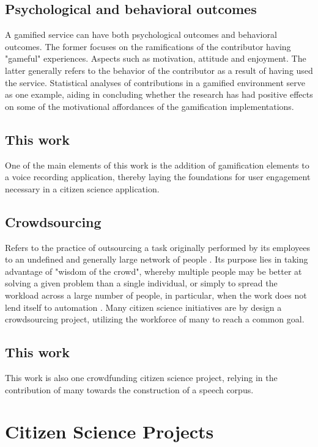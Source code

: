 \subsection{Psychological and behavioral outcomes}

A gamified service can have both psychological outcomes and behavioral outcomes. The former focuses on the ramifications of the contributor having "gameful" experiences. Aspects such as motivation, attitude and enjoyment. The latter generally refers to the behavior of the contributor as a result of having used the service. Statistical analyses of contributions in a gamified environment serve as one example, aiding in concluding whether the research has had positive effects on some of the motivational affordances of the gamification implementations.

\subsection{This work}

One of the main elements of this work is the addition of gamification elements to a voice recording application, thereby laying the foundations for user engagement necessary in a citizen science application.

\subsection{Crowdsourcing}

Refers to the practice of outsourcing a task originally performed by its employees to an undefined and generally large network of people \cite{howe2006rise}. Its purpose lies in taking advantage of "wisdom of the crowd", whereby multiple people may be better at solving a given problem than a single individual, or simply to spread the workload across a large number of people, in particular, when the work does not lend itself to automation \cite{kreitmair2019citizen}. Many citizen science initiatives are by design a crowdsourcing project, utilizing the workforce of many to reach a common goal.

\subsection{This work}

This work is also one crowdfunding citizen science project, relying in the contribution of many towards the construction of a speech corpus.

\section{Citizen Science Projects}

